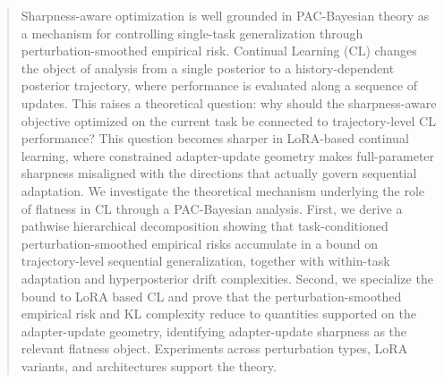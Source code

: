 \documentclass{article}
\begin{document}
\begin{abstract}
Sharpness-aware optimization is well grounded in PAC-Bayesian theory as a mechanism for controlling single-task generalization through perturbation-smoothed empirical risk. Continual Learning (CL) changes the object of analysis from a single posterior to a history-dependent posterior trajectory, where performance is evaluated along a sequence of updates. This raises a theoretical question: why should the sharpness-aware objective optimized on the current task be connected to trajectory-level CL performance? 
This question becomes sharper in LoRA-based continual learning, where constrained adapter-update geometry makes full-parameter sharpness misaligned with the directions that actually govern sequential adaptation.
We investigate the theoretical mechanism underlying the role of flatness in CL through a PAC-Bayesian analysis. 
First, we derive a pathwise hierarchical decomposition showing that task-conditioned perturbation-smoothed empirical risks accumulate in a bound on trajectory-level sequential generalization, together with within-task adaptation and hyperposterior drift complexities. 
Second, we specialize the bound to LoRA based CL and prove that the perturbation-smoothed empirical risk and KL complexity reduce to quantities supported on the adapter-update geometry, identifying adapter-update sharpness as the relevant flatness object.
Experiments across perturbation types, LoRA variants, and architectures support the theory.


\end{abstract}
\end{document}
